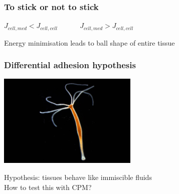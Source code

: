 \documentclass[compress]{beamer}
\begin{document}
\begin{frame}
\frametitle{To stick or not to stick}   


\begin{center}
$J_{cell,med}<J_{cell, cell}$ ~~~~~ $J_{cell,med}>J_{cell,cell}$
\end{center}

Energy minimisation leads to ball shape of entire tissue
\end{frame}

\begin{frame}
\frametitle{Differential adhesion hypothesis}   
\begin{center}
  \includegraphics[width=0.5\textwidth]{figures/cnidarians.jpg}
\end{center}
Hypothesis: tissues behave like immiscible fluids\\
How to test this with CPM?\\

\end{frame}
\end{document}
